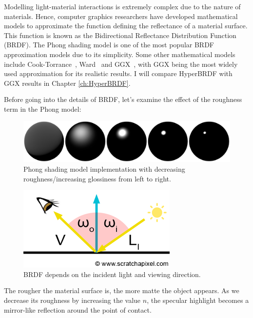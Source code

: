 Modelling light-material interactions is extremely complex due to the nature of materials. Hence, computer graphics researchers have developed mathematical models to approximate the function defining the reflectance of a material surface. This function is known as the Bidirectional Reflectance Distribution Function (BRDF). The Phong shading model is one of the most popular BRDF approximation models due to its simplicity. Some other mathematical models include Cook-Torrance~\cite{cooktorrance1982}, Ward~\cite{ward1992} and GGX~\cite{walter2007microfacet}, with GGX being the most widely used approximation for its realistic results. I will compare HyperBRDF with GGX results in Chapter \ref{ch:HyperBRDF}.

Before going into the details of BRDF, let's examine the effect of the roughness term in the Phong model:

\begin{figure}[h]
  \centering
   \includegraphics[width=\linewidth]{Images/Phong-roughness-coeff.pdf}
   \caption{Phong shading model implementation with decreasing roughness/increasing glossiness from left to right.}
   \label{fig:phong-roughness}
\end{figure}

\begin{figure}
  \centering
   \includegraphics[width=\linewidth]{Images/shad2-brdfdir}
   \caption{BRDF depends on the incident light and viewing direction.}
   \label{fig:brdf}
\end{figure}
The rougher the material surface is, the more matte the object appears. As we decrease its roughness by increasing the value $n$, the specular highlight becomes a mirror-like reflection around the point of contact. 


